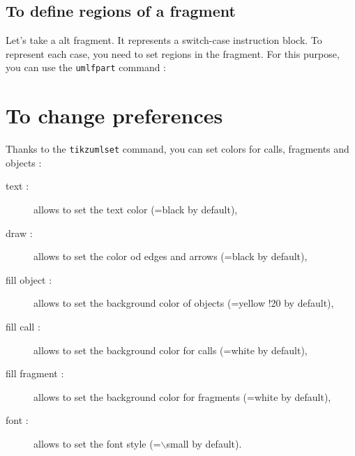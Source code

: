\documentclass[a4paper,11pt]{report}
\newcommand{\inputTikZ}[1]{%
  }%
\newcommand{\inputTikZ}[1]{%
    \texttt{[image: fig/\#1.pdf]}%
  }%
\begin{document}
\medskip

\begin{minipage}{0.5\textwidth}

\end{minipage}
\begin{minipage}{0.5\textwidth}
\begin{center}
\inputTikZ{fragmentname}
\end{center}
\end{minipage}

\subsection{To define regions of a fragment}\label{ss.fragpart}

Let's take a alt fragment. It represents a switch-case instruction block. To represent each case, you need to set regions in the fragment. For this purpose, you can use the {\tt umlfpart} command :

\medskip

\begin{minipage}{0.5\textwidth}

\end{minipage}
\begin{minipage}{0.5\textwidth}
\begin{center}
\inputTikZ{fragmentpart}
\end{center}
\end{minipage}

\section{To change preferences}\label{s.fitseq}

Thanks to the {\tt tikzumlset} command, you can set colors for calls, fragments and objects :

\begin{description}
\item[text :] allows to set the text color (=black by default),
\item[draw :] allows to set the color od edges and arrows (=black by default),
\item[fill object :] allows to set the background color of objects (=yellow !20 by default),
\item[fill call :] allows to set the background color for calls (=white by default),
\item[fill fragment :] allows to set the background color for fragments (=white by default),
\item[font :] allows to set the font style (=$\backslash$small by default).
\end{description}
\end{document}
